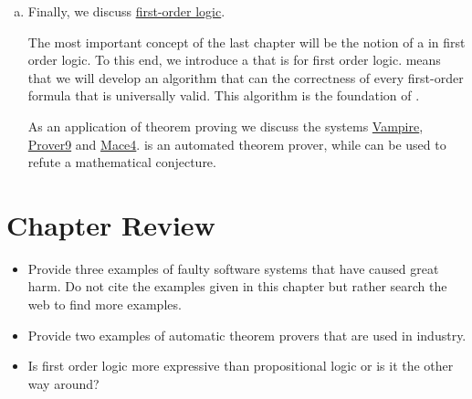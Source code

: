 \begin{enumerate}[(a)]
      As propositional logic is easier to grasp than first-order logic, we start our investigation
      of logic with propositional logic.  Furthermore, propositional logic has the advantage of
      being :  We will present an algorithm that can check whether a propositional formula
      is satisfiable.  In contrast to propositional logic, first-order logic is not decidable.

      Next, we discuss applications of propositional logic:  We will show how the  
      can be reduced to the question whether a formula from propositional logic is satisfiable.  We present
      the algorithm of  that can decide the satisfiability of a propositional formula
      and, for example, is able to solve the 8 queens problem.  
\item Finally, we discuss \href{https://en.wikipedia.org/wiki/First-order_logic}{first-order logic}.

      The most important concept of the last chapter will be the notion of a  in
      first order logic.  To this end, we introduce a  that is
       for first order logic.   means that we will develop an
      algorithm that can  the correctness of every first-order formula that is
      universally valid.  This algorithm is the foundation of .

      As an application of theorem proving we discuss the systems \href{https://vprover.github.io/}{Vampire},
      \href{https://www.cs.unm.edu/~mccune/mace4/}{Prover9} and
      \href{https://www.cs.unm.edu/~mccune/mace4/}{Mace4}.  is an automated theorem prover, while
       can be used to refute a mathematical conjecture.
\end{enumerate}

\section{Chapter Review}
\begin{itemize}
\item Provide three examples of faulty software systems that have caused great harm.
      Do not cite the examples given in this chapter but rather search the web to find more examples.
\item Provide two examples of automatic theorem provers that are used in industry.
\item Is first order logic more expressive than propositional logic or is it the other way around?
\end{itemize}


